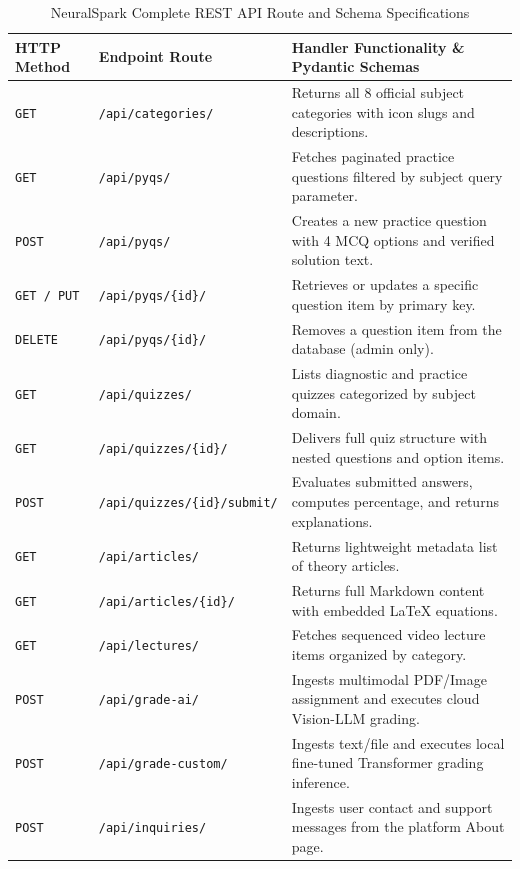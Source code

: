 \begin{table}[H]
\centering
\caption{NeuralSpark Complete REST API Route and Schema Specifications}
\label{tab:complete_api_specs}
\small
\begin{tabularx}{\textwidth}{p{2.5cm} p{4.2cm} X}
\toprule
\textbf{HTTP Method} & \textbf{Endpoint Route} & \textbf{Handler Functionality \& Pydantic Schemas} \\
\midrule
\texttt{GET} & \texttt{/api/categories/} & Returns all 8 official subject categories with icon slugs and descriptions. \\
\texttt{GET} & \texttt{/api/pyqs/} & Fetches paginated practice questions filtered by subject query parameter. \\
\texttt{POST} & \texttt{/api/pyqs/} & Creates a new practice question with 4 MCQ options and verified solution text. \\
\texttt{GET / PUT} & \texttt{/api/pyqs/\{id\}/} & Retrieves or updates a specific question item by primary key. \\
\texttt{DELETE} & \texttt{/api/pyqs/\{id\}/} & Removes a question item from the database (admin only). \\
\texttt{GET} & \texttt{/api/quizzes/} & Lists diagnostic and practice quizzes categorized by subject domain. \\
\texttt{GET} & \texttt{/api/quizzes/\{id\}/} & Delivers full quiz structure with nested questions and option items. \\
\texttt{POST} & \texttt{/api/quizzes/\{id\}/submit/} & Evaluates submitted answers, computes percentage, and returns explanations. \\
\texttt{GET} & \texttt{/api/articles/} & Returns lightweight metadata list of theory articles. \\
\texttt{GET} & \texttt{/api/articles/\{id\}/} & Returns full Markdown content with embedded LaTeX equations. \\
\texttt{GET} & \texttt{/api/lectures/} & Fetches sequenced video lecture items organized by category. \\
\texttt{POST} & \texttt{/api/grade-ai/} & Ingests multimodal PDF/Image assignment and executes cloud Vision-LLM grading. \\
\texttt{POST} & \texttt{/api/grade-custom/} & Ingests text/file and executes local fine-tuned Transformer grading inference. \\
\texttt{POST} & \texttt{/api/inquiries/} & Ingests user contact and support messages from the platform About page. \\
\bottomrule
\end{tabularx}
\end{table}

